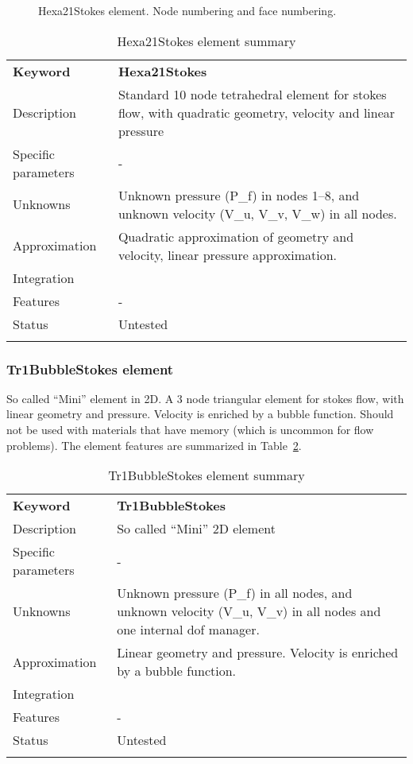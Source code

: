 \documentclass[a4paper]{article}
\newcommand{\param}[1]{\texttt{#1}} %
\newcommand{\templabel}{}%
\newcommand{\tempcaption}{}%
\newcounter{nelpar}
\newenvironment{elementsummary}[5]{%
  \gdef\tempcaption{#4}%
  \gdef\templabel{#5}%
  \setcounter{nelpar}{0}%
  \begin{center} %
    \begin{table}[!htb] %
      \begin{tabular}{|l|p{9cm}|}\hline %
        {\bf Keyword} & \bf{#1}\\ %
        {Description} & {#2}\\ %
        {Specific parameters} & {#3}\\ \hline %
}{
  \\ \hline %
      \end{tabular}%
      \caption{\tempcaption}%
      \label{\templabel}%
    \end{table}%
  \end{center}%
}
\newcommand{\elementParam}[1]{%
  \ifthenelse{\value{nelpar}>0} %
             {&{#1}}%
             {\setcounter{nelpar}{1}Parameters&{#1}}%
             \\%
}
\newcommand{\elementDescription}[2]{{#1} & {#2}\\ }
\begin{document}
\begin{figure}[htb]
 \centering
 \begin{makeimage}
  \raisebox{-0.5\height}{}
  \raisebox{-0.5\height}{}
 \end{makeimage}
 \caption{Hexa21Stokes element. Node numbering and face numbering.}
 \label{Tr1CBSfig}
\end{figure}

\begin{elementsummary}{Hexa21Stokes}{Standard 10 node tetrahedral element for stokes flow, with quadratic geometry, velocity and linear pressure}{-}{Hexa21Stokes element summary}{Hexa21Stokessummary}
\elementDescription{Unknowns}{Unknown pressure (P\_f) in nodes 1--8, and unknown velocity (V\_u, V\_v, V\_w) in all nodes.}
\elementDescription{Approximation}{Quadratic approximation of geometry and velocity, linear pressure approximation.}
\elementDescription{Integration}{}
\elementDescription{Features}{-}
\elementDescription{Status}{Untested}
\end{elementsummary}


\subsubsection{Tr1BubbleStokes element}
So called ``Mini'' element in 2D. A 3 node triangular element for stokes flow, with linear geometry and pressure. Velocity is enriched by a bubble function.
Should not be used with materials that have memory (which is uncommon for flow problems). The element features are summarized in Table~\ref{Tr1BubbleStokessummary}.

\begin{elementsummary}{Tr1BubbleStokes}{So called ``Mini'' 2D element}{-}{Tr1BubbleStokes element summary}{Tr1BubbleStokessummary}
\elementDescription{Unknowns}{Unknown pressure (P\_f) in all nodes, and unknown velocity (V\_u, V\_v) in all nodes and one internal dof manager.}
\elementDescription{Approximation}{Linear geometry and pressure. Velocity is enriched by a bubble function.}
\elementDescription{Integration}{}
\elementDescription{Features}{-}
\elementDescription{Status}{Untested}
\end{elementsummary}
\end{document}
